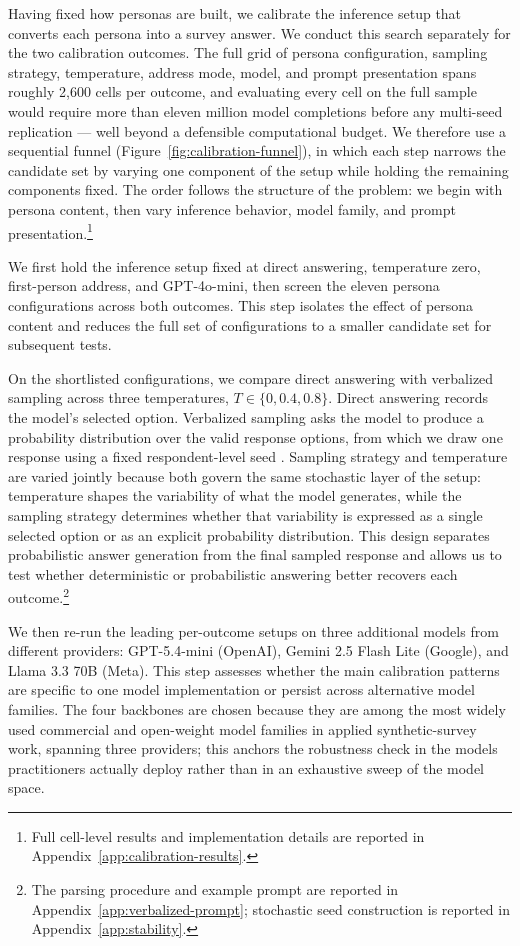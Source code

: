 Having fixed how personas are built, we calibrate the inference setup that
converts each persona into a survey answer. We conduct this search
separately for the two calibration outcomes. The full grid of persona
configuration, sampling strategy, temperature, address mode, model, and
prompt presentation spans roughly 2,600 cells per outcome, and evaluating
every cell on the full sample would require more than eleven million model
completions before any multi-seed replication --- well beyond a defensible
computational budget. We therefore use a sequential funnel
(Figure~\ref{fig:calibration-funnel}), in which each step narrows the
candidate set by varying one component of the setup while holding the
remaining components fixed. The order follows the structure of the problem:
we begin with persona content, then vary inference behavior, model family,
and prompt presentation.\footnote{Full cell-level results and
implementation details are reported in
Appendix~\ref{app:calibration-results}.}

We first hold the inference setup fixed at direct answering, temperature
zero, first-person address, and GPT-4o-mini, then screen the eleven persona
configurations across both outcomes. This step isolates the effect of
persona content and reduces the full set of configurations to a smaller
candidate set for subsequent tests.

On the shortlisted configurations, we compare direct answering with
verbalized sampling across three temperatures, $T \in \{0, 0.4, 0.8\}$.
Direct answering records the model's selected option. Verbalized sampling
asks the model to produce a probability distribution over the valid
response options, from which we draw one response using a fixed
respondent-level seed \citep{zhang2025verbalized}. %
Sampling strategy and temperature are varied jointly because both govern
the same stochastic layer of the setup: temperature shapes the variability
of what the model generates, while the sampling strategy determines whether
that variability is expressed as a single selected option or as an explicit
probability distribution. This design separates probabilistic answer
generation from the final sampled response and allows us to test whether
deterministic or probabilistic answering better recovers each
outcome.\footnote{The parsing procedure and example prompt are reported in
Appendix~\ref{app:verbalized-prompt}; stochastic seed construction is
reported in Appendix~\ref{app:stability}.}

We then re-run the leading per-outcome setups on three additional models
from different providers: GPT-5.4-mini (OpenAI), Gemini 2.5 Flash Lite
(Google), and Llama 3.3 70B (Meta). This step assesses whether the main
calibration patterns are specific to one model implementation or persist
across alternative model families. The four backbones are chosen because
they are among the most widely used commercial and open-weight model
families in applied synthetic-survey work, spanning three providers; this
anchors the robustness check in the models practitioners actually deploy
rather than in an exhaustive sweep of the model space.

